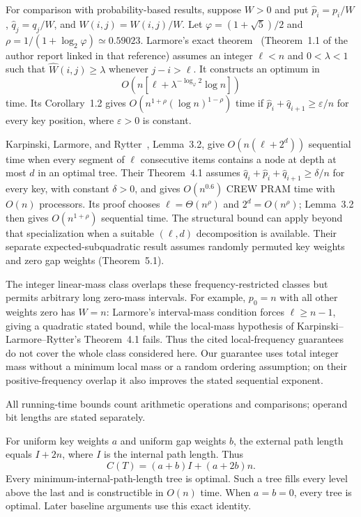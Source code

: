 \documentclass[11pt]{article}
\begin{document}
For comparison with probability-based results, suppose $W>0$ and put
$\widehat p_i=p_i/W$, $\widehat q_j=q_j/W$, and
$\widehat W(i,j)=W(i,j)/W$. Let $\varphi=(1+\sqrt5)/2$ and
$\rho=1/(1+\log_2\varphi)\simeq0.59023$.
Larmore's exact theorem~\cite{larmore} (Theorem~1.1 of the author report
linked in that reference) assumes an integer $\ell<n$ and $0<\lambda<1$
such that $\widehat W(i,j)\ge\lambda$ whenever $j-i>\ell$.
It constructs an optimum in
\[
 O\!\left(n\left[\ell+\lambda^{-\log_\varphi2}\log n\right]\right)
\]
time. Its Corollary~1.2 gives
$O(n^{1+\rho}(\log n)^{1-\rho})$ time if
$\widehat p_i+\widehat q_{i+1}\ge\varepsilon/n$ for every key position,
where $\varepsilon>0$ is constant.

Karpinski, Larmore, and Rytter~\cite{klr}, Lemma~3.2, give
$O(n(\ell+2^d))$ sequential time when every segment of $\ell$ consecutive
items contains a node at depth at most $d$ in an optimal tree.
Their Theorem~4.1 assumes
$\widehat q_i+\widehat p_i+\widehat q_{i+1}\ge\delta/n$ for every key,
with constant $\delta>0$, and gives $O(n^{0.6})$ CREW PRAM time with
$O(n)$ processors. Its proof chooses $\ell=\Theta(n^\rho)$ and $2^d=O(n^\rho)$;
Lemma~3.2 then gives $O(n^{1+\rho})$ sequential time.
The structural bound can apply beyond that specialization when a suitable
$(\ell,d)$ decomposition is available.
Their separate expected-subquadratic result assumes randomly permuted key
weights and zero gap weights (Theorem~5.1).

The integer linear-mass class overlaps these frequency-restricted classes
but permits arbitrary long zero-mass intervals. For example, $p_0=n$ with
all other weights zero has $W=n$: Larmore's interval-mass condition forces
$\ell\ge n-1$, giving a quadratic stated bound, while the local-mass
hypothesis of Karpinski--Larmore--Rytter's Theorem~4.1 fails.
Thus the cited local-frequency guarantees do not cover the whole class
considered here. Our guarantee uses total integer mass without a minimum
local mass or a random ordering assumption; on their positive-frequency
overlap it also improves the stated sequential exponent.

All running-time bounds count arithmetic operations and comparisons;
operand bit lengths are stated separately.


For uniform key weights $a$ and uniform gap weights $b$, the external path
length equals $I+2n$, where $I$ is the internal path length. Thus
\[
 C(T)=(a+b)I+(a+2b)n.
\]
Every minimum-internal-path-length tree is optimal. Such a tree fills every
level above the last and is constructible in $O(n)$ time. When $a=b=0$,
every tree is optimal. Later baseline arguments use this exact identity.
\end{document}
